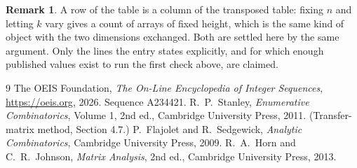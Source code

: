 \documentclass[11pt,a4paper]{article}
\theoremstyle{plain}
\theoremstyle{definition}
\newtheorem{remark}[theorem]{Remark}
\begin{document}
\begin{remark}
A row of the table is a column of the transposed table: fixing $n$ and letting $k$ vary gives a
count of arrays of fixed height, which is the same kind of object with the two dimensions
exchanged. Both are settled here by the same argument. Only the lines the entry states
explicitly, and for which enough published values exist to run the first check above, are
claimed.
\end{remark}

\begin{thebibliography}{9}
 The OEIS Foundation, \emph{The On-Line Encyclopedia of Integer
Sequences}, \url{https://oeis.org}, 2026. Sequence A234421.
 R.~P.~Stanley, \emph{Enumerative Combinatorics}, Volume 1, 2nd ed.,
Cambridge University Press, 2011. (Transfer-matrix method, Section 4.7.)
 P.~Flajolet and R.~Sedgewick, \emph{Analytic Combinatorics}, Cambridge
University Press, 2009.
 R.~A.~Horn and C.~R.~Johnson, \emph{Matrix Analysis}, 2nd ed., Cambridge
University Press, 2013.
\end{thebibliography}
\end{document}
